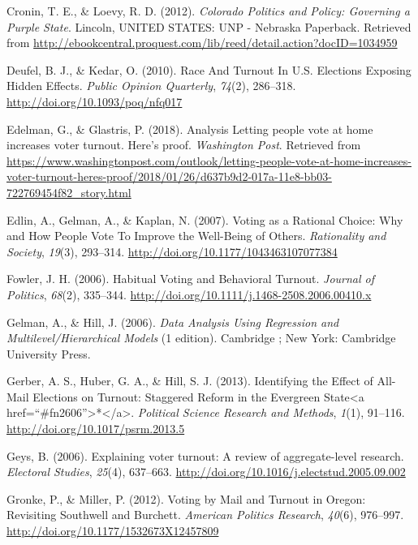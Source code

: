 \documentclass[12pt,twoside]{reedthesis}
\begin{document}
  \hypertarget{ref-cronin_colorado_2012}{}
  Cronin, T. E., \& Loevy, R. D. (2012). \emph{Colorado Politics and
  Policy: Governing a Purple State}. Lincoln, UNITED STATES: UNP -
  Nebraska Paperback. Retrieved from
  \url{http://ebookcentral.proquest.com/lib/reed/detail.action?docID=1034959}
  
  \hypertarget{ref-deufel_race_2010}{}
  Deufel, B. J., \& Kedar, O. (2010). Race And Turnout In U.S. Elections
  Exposing Hidden Effects. \emph{Public Opinion Quarterly}, \emph{74}(2),
  286--318. \url{http://doi.org/10.1093/poq/nfq017}
  
  \hypertarget{ref-edelman_analysis_2018}{}
  Edelman, G., \& Glastris, P. (2018). Analysis Letting people vote at
  home increases voter turnout. Here's proof. \emph{Washington Post}.
  Retrieved from
  \url{https://www.washingtonpost.com/outlook/letting-people-vote-at-home-increases-voter-turnout-heres-proof/2018/01/26/d637b9d2-017a-11e8-bb03-722769454f82_story.html}
  
  \hypertarget{ref-edlin_voting_2007}{}
  Edlin, A., Gelman, A., \& Kaplan, N. (2007). Voting as a Rational
  Choice: Why and How People Vote To Improve the Well-Being of Others.
  \emph{Rationality and Society}, \emph{19}(3), 293--314.
  \url{http://doi.org/10.1177/1043463107077384}
  
  \hypertarget{ref-fowler_habitual_2006}{}
  Fowler, J. H. (2006). Habitual Voting and Behavioral Turnout.
  \emph{Journal of Politics}, \emph{68}(2), 335--344.
  \url{http://doi.org/10.1111/j.1468-2508.2006.00410.x}
  
  \hypertarget{ref-gelman_data_2006}{}
  Gelman, A., \& Hill, J. (2006). \emph{Data Analysis Using Regression and
  Multilevel/Hierarchical Models} (1 edition). Cambridge ; New York:
  Cambridge University Press.
  
  \hypertarget{ref-gerber_identifying_2013}{}
  Gerber, A. S., Huber, G. A., \& Hill, S. J. (2013). Identifying the
  Effect of All-Mail Elections on Turnout: Staggered Reform in the
  Evergreen State\textless{}a
  href=``\#fn2606''\textgreater{}*\textless{}/a\textgreater{}.
  \emph{Political Science Research and Methods}, \emph{1}(1), 91--116.
  \url{http://doi.org/10.1017/psrm.2013.5}
  
  \hypertarget{ref-geys_explaining_2006}{}
  Geys, B. (2006). Explaining voter turnout: A review of aggregate-level
  research. \emph{Electoral Studies}, \emph{25}(4), 637--663.
  \url{http://doi.org/10.1016/j.electstud.2005.09.002}
  
  \hypertarget{ref-gronke_voting_2012}{}
  Gronke, P., \& Miller, P. (2012). Voting by Mail and Turnout in Oregon:
  Revisiting Southwell and Burchett. \emph{American Politics Research},
  \emph{40}(6), 976--997. \url{http://doi.org/10.1177/1532673X12457809}
  
\end{document}
